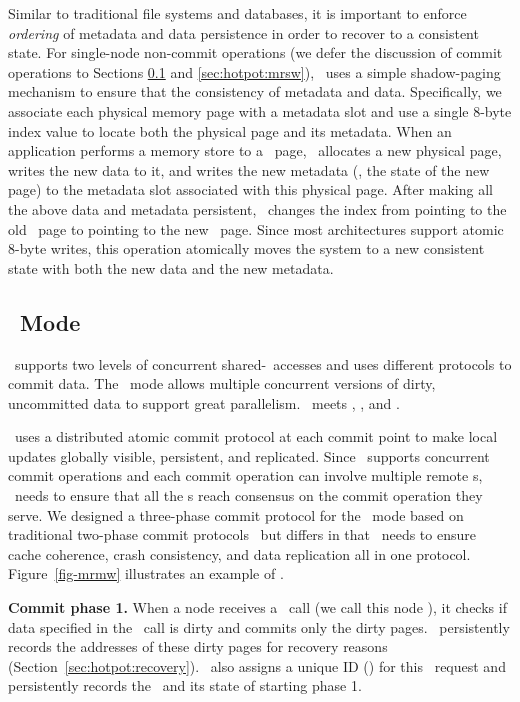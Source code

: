 Similar to traditional file systems and databases, 
it is important to enforce {\em ordering} of metadata and data persistence
in order to recover to a consistent state.
For single-node non-commit operations (we defer the discussion of commit operations to Sections \ref{sec:hotpot:mrmw} and \ref{sec:hotpot:mrsw}), 
\hotpot\ uses a simple shadow-paging mechanism to ensure that the consistency of metadata and data.
Specifically, we associate each physical memory page with a metadata slot
and use a single 8-byte index value to locate both the physical page and its metadata.
When an application performs a memory store to a \committed\ page,
\hotpot\ allocates a new physical page, writes the new data to it, and writes the new metadata 
(\eg, the state of the new page) to the metadata slot associated with this physical page.
After making all the above data and metadata persistent, \hotpot\ changes the index
from pointing to the old \committed\ page to pointing to the new \dirty\ page.
Since most architectures support atomic 8-byte writes, this operation atomically moves the system to a new consistent state with both the new data and the new metadata.



\subsection{\mrmw\ Mode}
\label{sec:hotpot:mrmw}
\hotpot\ supports two levels of concurrent shared-\nvm\ accesses and uses different protocols to commit data.
The \mrmw\ mode allows multiple concurrent versions of dirty, uncommitted data 
to support great parallelism.
\mrmw\ meets \rb, \rcm, and \re.

\mrmw\ uses a distributed atomic commit protocol at each commit point %
to make local updates globally visible, persistent, and replicated.
Since \mrmw\ supports concurrent commit operations 
and each commit operation can involve multiple remote \on{}s,
\hotpot\ needs to ensure that all the \on{}s reach consensus on the commit operation they serve. 
We designed a three-phase commit protocol for the \mrmw\ mode
based on traditional two-phase commit protocols~\cite{Samaras93,Gray78,Lampson81} but differs in that
\hotpot\ needs to ensure cache coherence, crash consistency, and data replication all in one protocol.
Figure~\ref{fig-mrmw} illustrates an example of \mrmw. 

{\bf Commit phase 1.} 
When a node receives a \commitxact\ call (we call this node {\em \xn}), it checks if data specified in the \commitxact\ call is dirty
and commits only the dirty pages.
\xn\ persistently records the addresses of these dirty pages for recovery reasons (Section~\ref{sec:hotpot:recovery}).
\xn\ also assigns a unique ID ({\em \xactid}) for this \commitxact\ request and persistently records the \xactid\ and its state of starting phase 1. 
 
